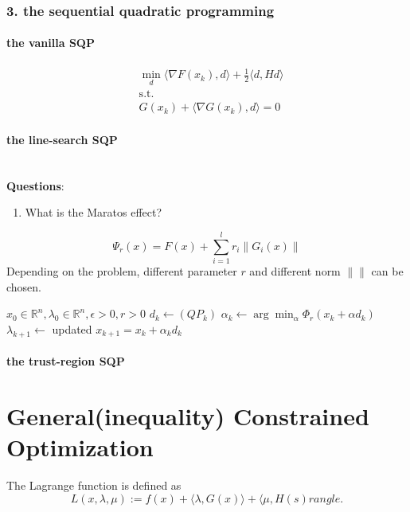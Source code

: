 \documentclass[a4paper,11pt,fleqn, draft]{book}
\theoremstyle{definition}
\theoremstyle{remark}
\newcommand{\Rn}{\mathbb{R}^n}
\begin{document}
\subsubsection{3. the sequential quadratic programming}
\paragraph{the vanilla SQP}
\begin{equation*}
	\tag{$QP_k$}
	\begin{aligned}
		& \min_d \langle \nabla F(x_k), d \rangle + \frac{1}{2} \langle d, H d \rangle\\
		& \text{s.t.}\\
		& G(x_k) + \langle \nabla G(x_k), d \rangle = 0
	\end{aligned}
\end{equation*}


\paragraph{the line-search SQP} 
\quad\\
\textbf{Questions}:
\begin{enumerate}
	\item What is the Maratos effect?
\end{enumerate}

\begin{equation}
	\Psi_r(x) = F(x) + \sum_{i = 1}^l r_i \|G_i(x)\|
\end{equation}
Depending on the problem, different parameter $r$ and different norm $\| \|$ can be chosen. 

\begin{algorithm}
	\begin{algorithmic}
		\Require \State $x_0 \in \Rn, \lambda_0 \in \Rn, \epsilon > 0, r > 0$
		\State $d_k \gets (QP_k)$
		\State $\alpha_k \gets \arg\min_\alpha \Phi_r ( x_k + \alpha d_k)$
		\State $\lambda_{k + 1} \gets $  updated
		\State $x_{k + 1} = x_k + \alpha_k d_k$
		\EndFor
	\end{algorithmic}
\end{algorithm}


\paragraph{the trust-region SQP}





\newpage
\section{General(inequality) Constrained Optimization}
The Lagrange function is defined as 
\begin{equation}
	L(x, \lambda, \mu):= f(x) + \langle \lambda, G(x) \rangle + \langle \mu, H(s) 
	rangle. 
\end{equation}
\end{document}
